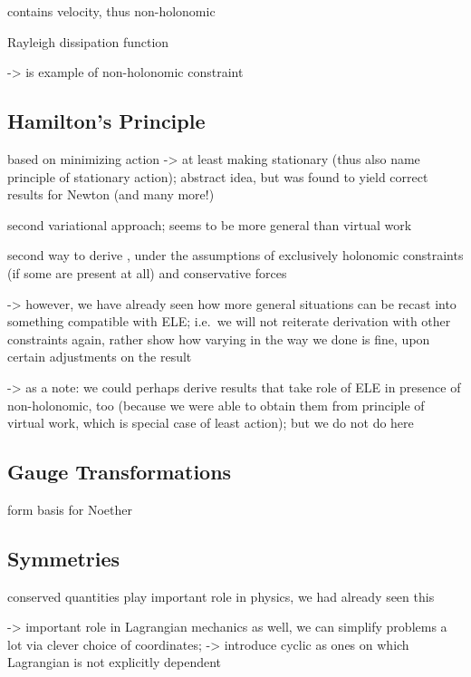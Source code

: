 \documentclass[../class_mech_main.tex]{subfiles}
\begin{document}
\begin{ex}[Friction]
	contains velocity, thus non-holonomic
	
	Rayleigh dissipation function

	-> is example of non-holonomic constraint
\end{ex}



		\subsection{Hamilton's Principle}
based on minimizing action -> at least making stationary (thus also name principle of stationary action); abstract idea, but was found to yield correct results for Newton (and many more!)

second variational approach; seems to be more general than virtual work



second way to derive , under the assumptions of exclusively holonomic constraints (if some are present at all) and conservative forces


-> however, we have already seen how more general situations can be recast into something compatible with ELE; i.e.~we will not reiterate derivation with other constraints again, rather show how varying in the way we done is fine, upon certain adjustments on the result


-> as a note: we could perhaps derive results that take role of ELE in presence of non-holonomic, too (because we were able to obtain them from principle of virtual work, which is special case of least action); but we do not do here




		\subsection{Gauge Transformations}
form basis for Noether




		\subsection{Symmetries}
conserved quantities play important role in physics, we had already seen this

-> important role in Lagrangian mechanics as well, we can simplify problems a lot via clever choice of coordinates; -> introduce cyclic as ones on which Lagrangian is not explicitly dependent
\end{document}
